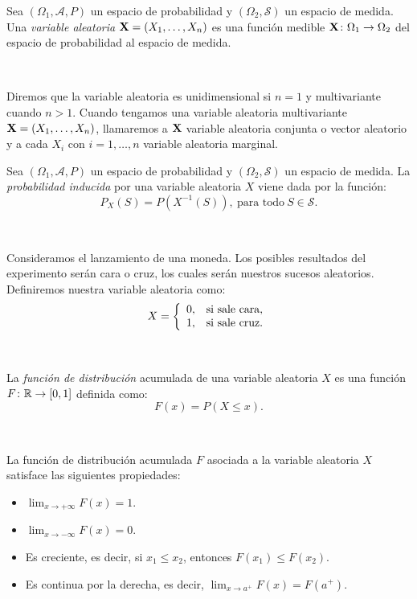 \documentclass[oneside,openright,titlepage,numbers=noenddot,openany,headinclude,footinclude=true,
cleardoublepage=empty,abstractoff,BCOR=5mm,paper=a4,fontsize=12pt,main=spanish]{scrreprt}
\begin{document}
\begin{definition}
Sea $(\Omega_1, \mathcal{A},P)$ un espacio de probabilidad y $(\Omega_2, \mathcal{S})$ un espacio de medida. Una \textit{variable aleatoria} $\textbf{X}=(X_1,\dots,X_n)$ es una función medible $\textbf{X}\colon \Omega_1 \to \Omega_2$ del espacio de probabilidad al espacio de medida.
\end{definition}\

Diremos que la variable aleatoria es unidimensional si $n=1$ y multivariante cuando $n > 1$. Cuando tengamos una variable aleatoria multivariante $\textbf{X}=(X_1,\dots,X_n)$, llamaremos a $\textbf{X}$ variable aleatoria conjunta o vector aleatorio y a cada $X_i$ con $i=1,\dots,n$ variable aleatoria marginal.\\


\begin{definition}
Sea $(\Omega_1, \mathcal{A},P)$ un espacio de probabilidad y $(\Omega_2, \mathcal{S})$ un espacio de medida. La \textit{probabilidad inducida} por una variable aleatoria $X$ viene dada por la función: $$P_X(S)=P(X^{-1}(S)), \ \text{para todo} \ S \in \mathcal{S}.$$
\end{definition}\

\begin{example}
Consideramos el lanzamiento de una moneda. Los posibles resultados del experimento serán cara o cruz, los cuales serán nuestros sucesos aleatorios. Definiremos nuestra variable aleatoria como: $$X= \left \{
\begin{array}{l l}
0, & \mbox{si sale cara}, \\
1, & \mbox{si sale cruz}.
\end{array}
\right.$$
\end{example}\

\begin{definition}
La \textit{función de distribución} acumulada de una variable aleatoria $X$ es una función $F\colon \mathbb{R}\to [0,1]$ definida como: $$F(x)=P(X\leq x).$$
\end{definition}\

\begin{proposition} La función de distribución acumulada $F$ asociada a la variable aleatoria $X$ satisface las siguientes propiedades:

\begin{itemize}
    \item $\displaystyle \lim_{x\to +\infty} F(x)=1$.
    \item $\displaystyle \lim_{x\to -\infty} F(x)=0$.
    \item Es creciente, es decir, si $x_1 \leq x_2$, entonces $F(x_1) \leq F(x_2)$.
    \item Es continua por la derecha, es decir, $\displaystyle \lim_{x\to a^+} F(x)=F(a^+)$.
\end{itemize}
\end{proposition}\
\end{document}
